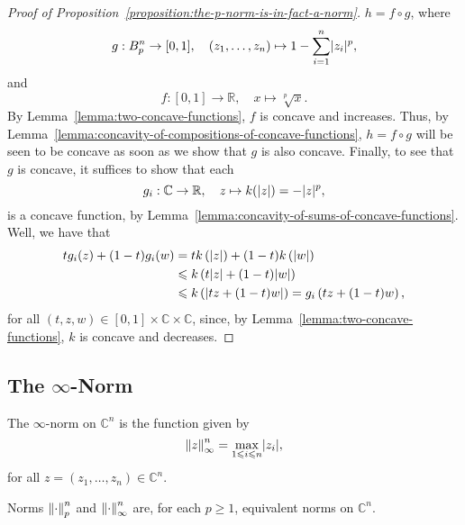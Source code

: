 \begin{proof}[Proof of Proposition~\ref{proposition:the-p-norm-is-in-fact-a-norm}]
  \(h=f\circ{g}\), where
  \begin{equation}\label{eq:g-function}
    g:B^{n}_{p}\to[0,1],
    \quad{(z_{1},\ldots,z_{n})\mapsto{1-\sum_{i=1}^{n}\lvert{z_{i}}\rvert^{p}}},
  \end{equation}
  and
  \begin{equation}\label{eq:f-function}
    f:[0,1]\to\mathbb{R},\quad{x\mapsto{\sqrt[p]{x}}}.
  \end{equation}
  By Lemma~\ref{lemma:two-concave-functions}, \(f\) is concave and increases.
  Thus, by Lemma~\ref{lemma:concavity-of-compositions-of-concave-functions},
  \(h=f\circ{g}\) will be seen to be concave as soon as we show that \(g\) is
  also concave. Finally, to see that \(g\) is concave, it suffices to show that
  each
  \[
    g_{i}:\mathbb{C}\to\mathbb{R},\quad{z\mapsto{k(\lvert{z}\rvert)=-\lvert{z}\rvert^{p}}},
  \]
  is a concave function, by
  Lemma~\ref{lemma:concavity-of-sums-of-concave-functions}. Well, we have that
  \begin{align*}
    tg_{i}(z)+(1-t)g_{i}(w)
    &=
    tk\left(\lvert{z}\rvert\right)+(1-t)k\left(\lvert{w}\rvert\right)
    \\
    &\leqslant
    k\left(t\lvert{z}\rvert+(1-t)\lvert{w}\rvert\right)
    \\
    &\leqslant
    k\left(\lvert{tz+(1-t)w}\rvert\right)
    =
    g_{i}\left(tz+(1-t)w\right),
  \end{align*}
  for all \((t,z,w)\in{[0,1]\times\mathbb{C}\times\mathbb{C}}\), since,
  by Lemma~\ref{lemma:two-concave-functions}, \(k\) is concave and decreases.
\end{proof}

\subsection{The \(\infty\)-Norm}\label{subsec:the-infty-norm}

\begin{definition}
  The \(\infty\)-norm on \(\mathbb{C}^{n}\) is the function given by
  \[
    \left\lVert{z}\right\rVert^{n}_{\infty}
    =
    \max\limits_{1\leqslant{i}\leqslant{n}}\lvert{z_{i}}\rvert,
  \]
  for all \(z=(z_{1},\ldots,z_{n})\in\mathbb{C}^{n}\).
\end{definition}

\begin{proposition}
  Norms \(\left\lVert{\cdot}\right\rVert^{n}_{p}\) and \(\left\lVert{\cdot}\right\rVert^{n}_{\infty}\) are, for
  each \(p\geqslant{1}\), equivalent norms on \(\mathbb{C}^{n}\).
\end{proposition}

